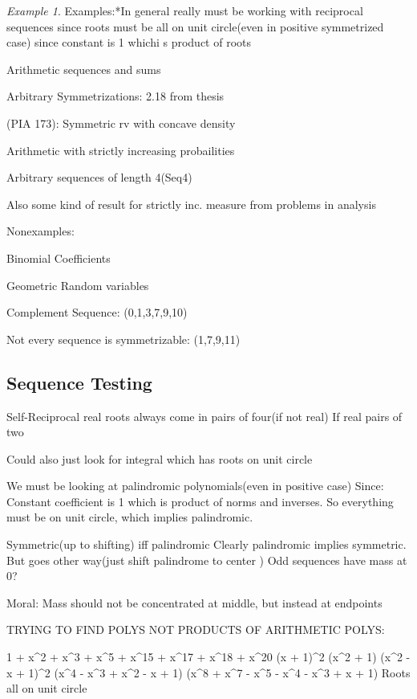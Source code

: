 \documentclass[11pt]{article}
\theoremstyle{remark}
\newtheorem*{example}{Example}
\begin{document}
\begin{example}
	Examples:*In general really must be working with reciprocal sequences since roots must be all on unit circle(even in positive symmetrized case) since constant is 1 whichi s product of roots

	Arithmetic sequences and sums
	
	Arbitrary Symmetrizations: 
		2.18 from thesis
	
	(PIA 173): Symmetric rv with concave density
	
	Arithmetic with strictly increasing probailities
	
	Arbitrary sequences of length 4(Seq4)
	
	Also some kind of result for strictly inc. measure from problems in analysis



Nonexamples:
	
	Binomial Coefficients
	
	Geometric Random variables
	
	Complement Sequence: (0,1,3,7,9,10)
	
	Not every sequence is symmetrizable: (1,7,9,11)

\end{example}

\subsection{Sequence Testing}

Self-Reciprocal real roots always come in pairs of four(if not real)
	If real pairs of two
	
Could also just look for integral which has roots on unit circle

We must be looking at palindromic polynomials(even in positive case) Since:
	Constant coefficient is 1 which is product of norms and inverses. So everything must be on unit circle, which implies palindromic.
	
Symmetric(up to shifting) iff palindromic
	Clearly palindromic implies symmetric. But goes other way(just shift palindrome to center )
		Odd sequences have mass at 0?
		
Moral: Mass should not be concentrated at middle, but instead at endpoints

TRYING TO FIND POLYS NOT PRODUCTS OF ARITHMETIC POLYS:

	1 + x^2 + x^3 + x^5 + x^15 + x^17 + x^18 + x^20
	(x + 1)^2 (x^2 + 1) (x^2 - x + 1)^2 (x^4 - x^3 + x^2 - x + 1) (x^8 + x^7 - x^5 - x^4 - x^3 + x + 1)
	Roots all on unit circle
	
\end{document}
